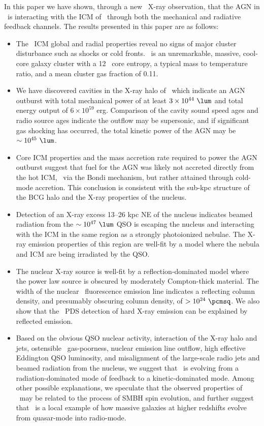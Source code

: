 \documentclass[useAMS,usenatbib]{mn2e}
\begin{document}
In this paper we have shown, through a new \cxo\ X-ray observation,
that the AGN in \inine\ is interacting with the ICM of \rxj\ through
both the mechanical and radiative feedback channels. The results
presented in this paper are as follows:
\begin{itemize}
\item The \rxj\ ICM global and radial properties reveal no signs of
  major cluster disturbance such as shocks or cold fronts. \rxj\ is an
  unremarkable, massive, cool-core galaxy cluster with a 12 \ent\ core
  entropy, a typical mass to temperature ratio, and a mean cluster gas
  fraction of 0.11.
\item We have discovered cavities in the X-ray halo of \irs\ which
  indicate an AGN outburst with total mechanical power of at least $3
  \times 10^{44} ~\lum$ and total energy output of $6 \times 10^{59}$
  erg. Comparison of the cavity sound speed ages and radio source ages
  indicate the outflow may be supersonic, and if significant gas
  shocking has occurred, the total kinetic power of the AGN may be
  $\sim 10^{45} ~\lum$.
\item Core ICM properties and the mass accretion rate required to
  power the AGN outburst suggest that fuel for the AGN was likely not
  accreted directly from the hot ICM, \ie\ via the Bondi mechanism,
  but rather attained through cold-mode accretion. This conclusion is
  consistent with the sub-kpc structure of the BCG halo and the X-ray
  properties of the nucleus.
\item Detection of an X-ray excess 13--26 kpc NE of the nucleus
  indicates beamed radiation from the $\sim 10^{47} ~\lum$ QSO is
  escaping the nucleus and interacting with the ICM in the same region
  as a strongly photoionized nebulae. The X-ray emission properties of
  this region are well-fit by a model where the nebula and ICM are
  being irradiated by the QSO.
\item The nuclear X-ray source is well-fit by a reflection-dominated
  model where the power law source is obscured by moderately
  Compton-thick material. The width of the nuclear \feka\ fluorescence
  emission line indicates a reflecting column density, and presumably
  obscuring column density, of $> 10^{24} ~\pcmsq$. We also show that
  the \bepposax\ PDS detection of hard X-ray emission can be explained
  by reflected emission.
\item Based on the obvious QSO nuclear activity, interaction of the
  X-ray halo and jets, ostensible \irs\ gas-poorness, nuclear emission
  line outflow, high effective Eddington QSO luminosity, and
  misalignment of the large-scale radio jets and beamed radiation from
  the nucleus, we suggest that \irs\ is evolving from a
  radiation-dominated mode of feedback to a kinetic-dominated
  mode. Among other possible explanations, we speculate that the
  observed properties of \irs\ may be related to the process of SMBH
  spin evolution, and further suggest that \irs\ is a local example of
  how massive galaxies at higher redshifts evolve from quasar-mode
  into radio-mode.
\end{itemize}
\end{document}
